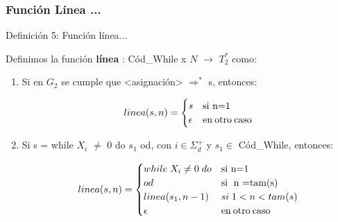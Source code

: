 \documentclass[xcolor=table]{beamer}
\begin{document}
\begin{frame}[fragile]\frametitle{Función Línea ...} \footnotesize
\begin{block}{Definición 5: Función línea...} 
\end{block}

Definimos la función \textbf{línea} : Cód\_While x $N$ $\rightarrow$ $T_2^*$ como:

\begin{enumerate}
    \item Si en $G_2$ se cumple que <asignación> $\Rightarrow^*$ s, entonces:
    
    \scriptsize\begin{equation*} linea(s,n) = \begin{cases} s & \text{si n=1}\\\epsilon &\text{en\:otro\:caso} \end{cases} \end{equation*}

    \item Si s = while $X_i$ $\neq$ 0 do $s_1$ od, con $i \in \Sigma_d^+$ y $s_1 \in$ Cód\_While, entonces:

    \scriptsize\begin{equation*} linea(s,n) = 
    \begin{cases} 
            while\; X_i \neq 0 \;do & \text{si n=1}\\
            od                      & \text{si\; n =tam(s)}\\
             linea(s_1,n-1)         &  si\; 1 <n<tam(s) \\ 
            \epsilon                & \text{en\:otro\:caso}
    \end{cases} \end{equation*}

   
        
\end{enumerate}


\end{frame}
\end{document}
